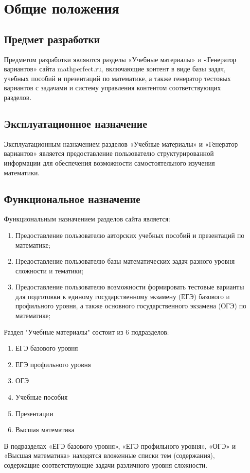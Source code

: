 \section{Общие положения}
\subsection{Предмет разработки}
  Предметом разработки являются разделы «Учебные материалы» и «Генератор вариантов» сайта mathperfect.ru, включающие контент в виде базы задач, учебных пособий и презентаций по математике, а также генератор тестовых вариантов с задачами и систему управления контентом соответствующих разделов.

\subsection{Эксплуатационное назначение}
  Эксплуатационным назначением разделов «Учебные материалы» и «Генератор вариантов» является предоставление пользователю структурированной информации для обеспечения возможности самостоятельного изучения математики.

\subsection{Функциональное назначение}
  Функциональным назначением разделов сайта является:
\begin{enumerate}
  \item Предоставление пользователю авторских учебных пособий и презентаций по математике;
  \item Предоставление пользователю базы математических задач разного уровня сложности и тематики;
  \item Предоставление пользователю возможности формировать тестовые варианты для подготовки к единому государственному экзамену (ЕГЭ) базового и профильного уровня, а также основного государственного экзамена (ОГЭ) по математике;
\end{enumerate}

Раздел "Учебные материалы" состоит из 6 подразделов:
\begin{enumerate}
  \item ЕГЭ базового уровня
  \item ЕГЭ профильного уровня
  \item ОГЭ
  \item Учебные пособия
  \item Презентации
  \item Высшая математика
\end{enumerate}
В подразделах «ЕГЭ базового уровня», «ЕГЭ профильного уровня», «ОГЭ» и «Высшая математика» находятся вложенные списки тем (содержания), содержащие соответствующие задачи различного уровня сложности.

